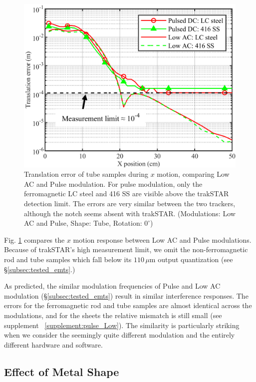 \documentclass[journal,twoside,web]{ieeecolor}
\begin{document}
\begin{figure}[!htbp]
\centerline{\includegraphics[width=\columnwidth]{chaic11.png}}
\caption{Translation error of tube samples during $x$ motion, comparing Low AC and Pulse modulation. For pulse modulation, only the ferromagnetic LC steel and 416 SS are visible above the trakSTAR detection limit. The errors are very similar between the two trackers, although the notch seems absent with trakSTAR.
(Modulations: Low AC and Pulse, Shape: Tube, Rotation: $0^\circ$)}
\label{xmoving_3DGuidance}
\end{figure} 

Fig. \ref{xmoving_3DGuidance} compares the $x$ motion response between Low AC and Pulse modulations. Because of trakSTAR's high measurement limit, we omit the non-ferromagnetic rod and tube samples which fall below its  $110\,\mu$m output quantization (see \S\ref{subsec:tested_emts}.) 

As predicted, the similar modulation frequencies of Pulse and Low AC modulation (\S\ref{subsec:tested_emts}) result in similar interference responses. The errors for the ferromagnetic rod and tube samples are almost identical across the modulations, and for the sheets the relative mismatch is still small (see supplement ~\ref{supplement:pulse_Low}). The similarity is particularly striking when we consider the seemingly quite different modulation and the entirely different hardware and software.

\subsection{Effect of Metal Shape} 
\label{sec:metal_shape}
\end{document}
